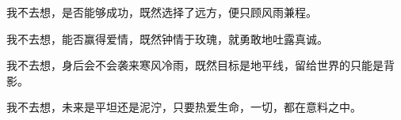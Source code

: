 	
\cnabstract


我不去想，是否能够成功，既然选择了远方，便只顾风雨兼程。

我不去想，能否赢得爱情，既然钟情于玫瑰，就勇敢地吐露真诚。

我不去想，身后会不会袭来寒风冷雨，既然目标是地平线，留给世界的只能是背影。

我不去想，未来是平坦还是泥泞，只要热爱生命，一切，都在意料之中。




